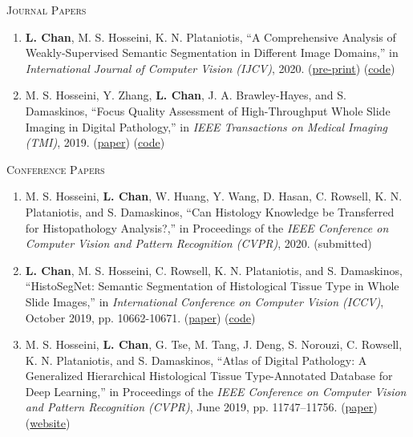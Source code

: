 \documentclass[letterpaper, 12pt]{cv_style}
\begin{document}
\textsc{Journal Papers}
\begin{enumerate}
	\item \textbf{L. Chan}, M. S. Hosseini, K. N. Plataniotis, ``A Comprehensive Analysis of Weakly-Supervised Semantic Segmentation in Different Image Domains,'' in \emph{International Journal of Computer Vision (IJCV)}, 2020. (\href{https://arxiv.org/pdf/1912.11186.pdf}{pre-print}) (\href{https://github.com/lyndonchan/wsss-analysis}{code})
	\item M. S. Hosseini, Y. Zhang, \textbf{L. Chan}, J. A. Brawley-Hayes, and S. Damaskinos, ``Focus Quality Assessment of High-Throughput Whole Slide Imaging in Digital Pathology,'' in \emph{IEEE Transactions on Medical Imaging (TMI)}, 2019. (\href{https://ieeexplore.ieee.org/abstract/document/8725582}{paper}) (\href{https://github.com/mahdihosseini/FQPath}{code})
\end{enumerate}

\newpage
\textsc{Conference Papers}
\begin{enumerate}
	\item M. S. Hosseini, \textbf{L. Chan}, W. Huang, Y. Wang, D. Hasan, C. Rowsell, K. N. Plataniotis, and S. Damaskinos, ``Can Histology Knowledge be Transferred for Histopathology Analysis?,'' in Proceedings of the \emph{IEEE Conference on Computer Vision and Pattern Recognition (CVPR)}, 2020. (submitted)
	\item \textbf{L. Chan}, M. S. Hosseini, C. Rowsell, K. N. Plataniotis, and S. Damaskinos, ``HistoSegNet: Semantic Segmentation of Histological Tissue Type in Whole Slide Images,'' in \emph{International Conference on Computer Vision (ICCV)}, October 2019, pp. 10662-10671. (\href{http://openaccess.thecvf.com/content_ICCV_2019/papers/Chan_HistoSegNet_Semantic_Segmentation_of_Histological_Tissue_Type_in_Whole_Slide_ICCV_2019_paper.pdf}{paper}) (\href{https://github.com/lyndonchan/hsn_v1}{code})
	\item M. S. Hosseini, \textbf{L. Chan}, G. Tse, M. Tang, J. Deng, S. Norouzi, C. Rowsell, K. N. Plataniotis, and S. Damaskinos, ``Atlas of Digital Pathology: A Generalized Hierarchical Histological Tissue Type-Annotated Database for Deep Learning,'' in Proceedings of the \emph{IEEE Conference on Computer Vision and Pattern Recognition (CVPR)}, June 2019, pp. 11747–11756. (\href{http://openaccess.thecvf.com/content_CVPR_2019/html/Hosseini_Atlas_of_Digital_Pathology_A_Generalized_Hierarchical_Histological_Tissue_Type-Annotated_CVPR_2019_paper.html}{paper}) (\href{http://www.dsp.utoronto.ca/projects/ADP/}{website})
\end{enumerate}
\end{document}
